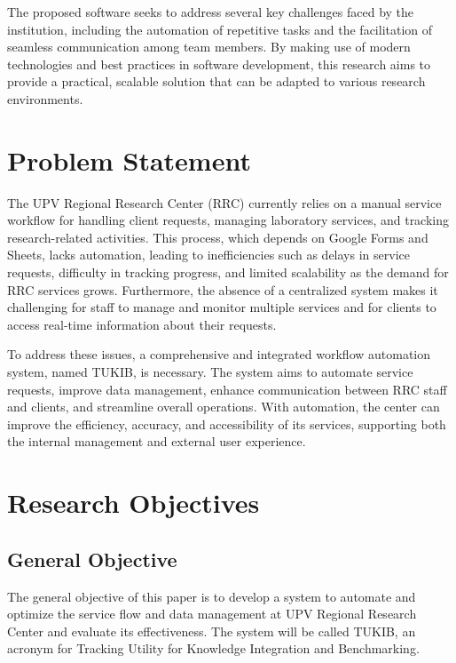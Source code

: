 The proposed software seeks to address several key challenges faced by the institution, including the automation of repetitive tasks and the facilitation of seamless communication among team members. By making use of modern technologies and best practices in software development, this research aims to provide a practical, scalable solution that can be adapted to various research environments.

\section{Problem Statement}


The UPV Regional Research Center (RRC) currently relies on a manual service workflow for handling client requests, managing laboratory services, and tracking research-related activities. This process, which depends on Google Forms and Sheets, lacks automation, leading to inefficiencies such as delays in service requests, difficulty in tracking progress, and limited scalability as the demand for RRC services grows. Furthermore, the absence of a centralized system makes it challenging for staff to manage and monitor multiple services and for clients to access real-time information about their requests.

To address these issues, a comprehensive and integrated workflow automation system, named TUKIB, is necessary. The system aims to automate service requests, improve data management, enhance communication between RRC staff and clients, and streamline overall operations. With automation, the center can improve the efficiency, accuracy, and accessibility of its services, supporting both the internal management and external user experience.

\section{Research Objectives}
\label{sec:researchobjectives}

\subsection{General Objective}
\label{sec:generalobjective}

The general objective of this paper is to develop a system to automate and optimize the service flow and data management at UPV Regional Research Center and evaluate its effectiveness. The system will be called TUKIB, an acronym for Tracking Utility for Knowledge Integration and Benchmarking. 


